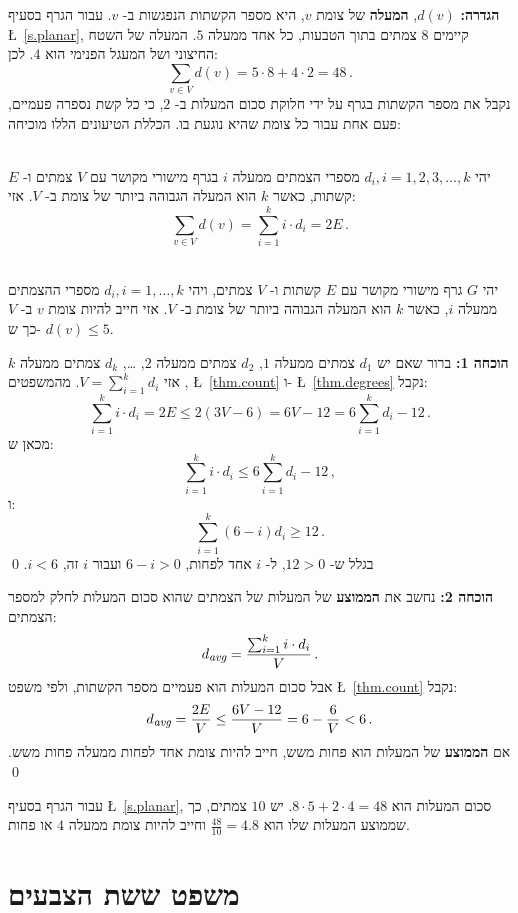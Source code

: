 \textbf{הגדרה:}
$d(v)$,
\textbf{המעלה}
של צומת
$v$,
היא מספר הקשתות הנפגשות ב-%
$v$.
עבור הגרף בסעיף
\L{~\ref{s.planar}},
קיימים 
$8$
צמתים בתוך הטבעות, כל אחד ממעלה
$5$.
המעלה של השטח החיצוני ושל המעגל הפנימי הוא 
$4$.
לכן:
\[
\sum_{v\in V} d(v) = 5\cdot 8 + 4\cdot 2=48\,.
\]
נקבל את מספר הקשתות בגרף על ידי חלוקת סכום המעלות ב-%
$2$,
כי כל קשת נספרה פעמיים, פעם אחת עבור כל צומת שהיא נוגעת בו.
הכללת הטיעונים הללו מוכיחה:
\begin{theorem}\label{thm.degrees}\mbox{}\\
יהי
$d_i, i=1,2,3,\ldots,k$
מספרי הצמתים ממעלה
$i$
בגרף מישורי מקושר עם
$V$
צמתים ו-%
$E$ 
קשתות, כאשר
$k$
הוא המעלה הגבוהה ביותר של צומת ב-%
$V$.
אזי:
\[
\sum_{v\in V} d(v) =\sum_{i=1}^{k} i\cdot d_i=2E\,.
\]
\end{theorem}
\vspace*{-6ex}
\begin{theorem}\label{thm.degree5}\mbox{}\\
יהי
$G$
גרף מישורי מקושר עם
$E$
קשתות ו-%
$V$
צמתים, ויהי
$d_i,i=1,\ldots,k$
מספרי ההצמתים ממעלה
$i$,
כאשר
$k$
הוא המעלה הגבוהה ביותר של צומת ב-%
$V$.
אזי חייב להיות צומת
$v$
ב-%
$V$
כך ש-%
$d(v) \leq 5$.
\end{theorem}
\textbf{הוכחה 1:}
ברור שאם יש 
$d_1$
צמתים ממעלה
$1$, $d_2$ 
צמתים ממעלה
$2$, \ldots, $d_k$
צמתים ממעלה
$k$, 
אזי
$V=\sum_{i=1}^{k}d_i$. 
מהמשפטים
\L{~\ref{thm.count}}
ו-%
\L{~\ref{thm.degrees}}
נקבל:
\[
\sum_{i=1}^{k} i\cdot d_i=2E\leq 2(3V-6) = 6V-12=6\sum_{i=1}^{k} d_i -12\,.
\]
מכאן ש:
\[
\sum_{i=1}^{k} i\cdot d_i \leq 6\sum_{i=1}^{k} d_i -12\,,
\]
ו:
\[
\sum_{i=1}^{k} (6-i)d_i\geq 12\,.
\]
בגלל ש-%
$12>0$,
ל-%
$i$
אחד לפחות,
$6-i>0$
ועבור 
$i$
זה,
$i<6$. 
\qed

\textbf{הוכחה 2:}
נחשב את 
\textbf{הממוצע}
של המעלות של הצמתים שהוא סכום המעלות לחלק למספר הצמתים:
\[
d_{\textit{\footnotesize avg}}=\frac{\sum_{i=1}^{k} i\cdot d_i}{V}\,.
\]
אבל סכום המעלות הוא פעמיים מספר הקשתות, ולפי משפט
\L{~\ref{thm.count}}
נקבל:
\[
d_{\textit{\footnotesize avg}}=\frac{2E}{V}\leq \frac{6V-12}{V}=6-\frac{6}{V}<6\,.
\]
אם 
\textbf{הממוצע}
של המעלות הוא פחות משש, חייב להיות צומת אחד לפחות ממעלה פחות משש.
\qed


עבור הגרף בסעיף
\L{~\ref{s.planar}},
סכום המעלות הוא
$8\cdot 5 + 2\cdot 4=48$.
יש 
$10$
צמתים, כך שממוצע המעלות שלו הוא
$\frac{48}{10}=4.8$
וחייב להיות צומת ממעלה 
$4$
או פחות.

\section{משפט ששת הצבעים}

